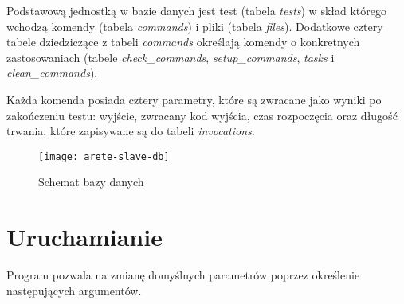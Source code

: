 \documentclass[00-praca-magisterska.tex]{subfiles}
\begin{document}
Podstawową jednostką w bazie danych jest test (tabela \emph{tests}) w skład
którego wchodzą komendy (tabela \emph{commands}) i pliki (tabela \emph{files}).
Dodatkowe cztery tabele dziedziczące z tabeli \emph{commands} określają komendy
o konkretnych zastosowaniach (tabele \emph{check\_commands},
\emph{setup\_commands}, \emph{tasks} i \emph{clean\_commands}).

Każda komenda posiada cztery parametry, które są zwracane jako wyniki po
zakończeniu testu: wyjście, zwracany kod wyjścia, czas rozpoczęcia oraz długość
trwania, które zapisywane są do tabeli \emph{invocations}.

\begin{figure}[htb]
\begin{center}
\leavevmode
\texttt{[image: arete-slave-db]}
\end{center}
\caption{Schemat bazy danych}
\label{fig:arete-slave-db}
\end{figure}

\section{Uruchamianie}
\label{arete-slave-run}

Program  pozwala na zmianę domyślnych parametrów poprzez
określenie następujących argumentów.
\end{document}
